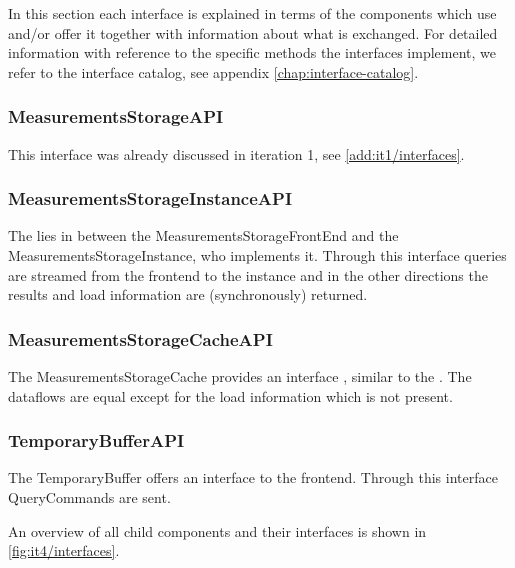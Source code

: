 \npar In this section each interface is explained in terms of the components
which use and/or offer it together with information about what is exchanged. For
detailed information with reference to the specific methods the interfaces
implement, we refer to the interface catalog, see appendix
\ref{chap:interface-catalog}.

\subsubsection{MeasurementsStorageAPI}

\npar This interface was already discussed in iteration 1, see
\ref{add:it1/interfaces}.

\subsubsection{MeasurementsStorageInstanceAPI}

\npar The  lies in between the
MeasurementsStorageFrontEnd and the MeasurementsStorageInstance, who implements
it. Through this interface queries are streamed from the frontend to the
instance and in the other directions the results and load information are
(synchronously) returned.

\subsubsection{MeasurementsStorageCacheAPI}

\npar The MeasurementsStorageCache provides an interface
, similar to the
. The dataflows are equal except for
the load information which is not present.

\subsubsection{TemporaryBufferAPI}

\npar The TemporaryBuffer offers an  interface
to the frontend. Through this interface QueryCommands are sent.

\npar An overview of all child components and their interfaces is shown in
\ref{fig:it4/interfaces}.

